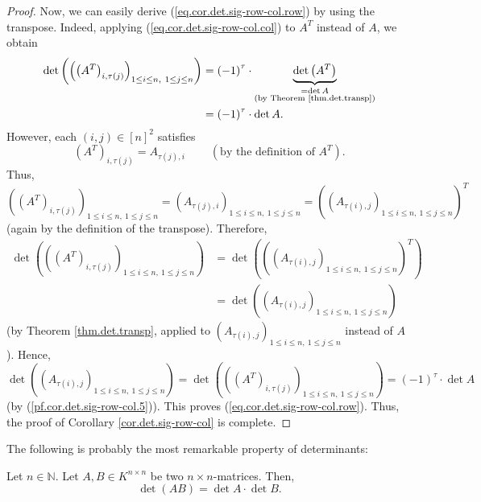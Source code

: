 \begin{proof}
Now, we can easily derive (\ref{eq.cor.det.sig-row-col.row}) by using the
transpose. Indeed, applying (\ref{eq.cor.det.sig-row-col.col}) to $A^{T}$
instead of $A$, we obtain%
\begin{align}
\det\left(  \left(  \left(  A^{T}\right)  _{i,\tau\left(  j\right)  }\right)
_{1\leq i\leq n,\ 1\leq j\leq n}\right)   &  =\left(  -1\right)  ^{\tau}%
\cdot\underbrace{\det\left(  A^{T}\right)  }_{\substack{=\det A\\\text{(by
Theorem \ref{thm.det.transp})}}}\nonumber\\
&  =\left(  -1\right)  ^{\tau}\cdot\det A. \label{pf.cor.det.sig-row-col.5}%
\end{align}
However, each $\left(  i,j\right)  \in\left[  n\right]  ^{2}$ satisfies%
\[
\left(  A^{T}\right)  _{i,\tau\left(  j\right)  }=A_{\tau\left(  j\right)
,i}\ \ \ \ \ \ \ \ \ \ \left(  \text{by the definition of }A^{T}\right)  .
\]
Thus,%
\[
\left(  \left(  A^{T}\right)  _{i,\tau\left(  j\right)  }\right)  _{1\leq
i\leq n,\ 1\leq j\leq n}=\left(  A_{\tau\left(  j\right)  ,i}\right)  _{1\leq
i\leq n,\ 1\leq j\leq n}=\left(  \left(  A_{\tau\left(  i\right)  ,j}\right)
_{1\leq i\leq n,\ 1\leq j\leq n}\right)  ^{T}%
\]
(again by the definition of the transpose). Therefore,%
\begin{align*}
\det\left(  \left(  \left(  A^{T}\right)  _{i,\tau\left(  j\right)  }\right)
_{1\leq i\leq n,\ 1\leq j\leq n}\right)   &  =\det\left(  \left(  \left(
A_{\tau\left(  i\right)  ,j}\right)  _{1\leq i\leq n,\ 1\leq j\leq n}\right)
^{T}\right) \\
&  =\det\left(  \left(  A_{\tau\left(  i\right)  ,j}\right)  _{1\leq i\leq
n,\ 1\leq j\leq n}\right)
\end{align*}
(by Theorem \ref{thm.det.transp}, applied to $\left(  A_{\tau\left(  i\right)
,j}\right)  _{1\leq i\leq n,\ 1\leq j\leq n}$ instead of $A$). Hence,%
\[
\det\left(  \left(  A_{\tau\left(  i\right)  ,j}\right)  _{1\leq i\leq
n,\ 1\leq j\leq n}\right)  =\det\left(  \left(  \left(  A^{T}\right)
_{i,\tau\left(  j\right)  }\right)  _{1\leq i\leq n,\ 1\leq j\leq n}\right)
=\left(  -1\right)  ^{\tau}\cdot\det A
\]
(by (\ref{pf.cor.det.sig-row-col.5})). This proves
(\ref{eq.cor.det.sig-row-col.row}). Thus, the proof of Corollary
\ref{cor.det.sig-row-col} is complete.
\end{proof}

The following is probably the most remarkable property of determinants:

\begin{theorem}
\label{thm.det.detAB}Let $n\in\mathbb{N}%
$. Let $A,B\in K^{n\times n}$ be two $n\times n$-matrices. Then,%
\[
\det\left(  AB\right)  =\det A\cdot\det B.
\]

\end{theorem}


